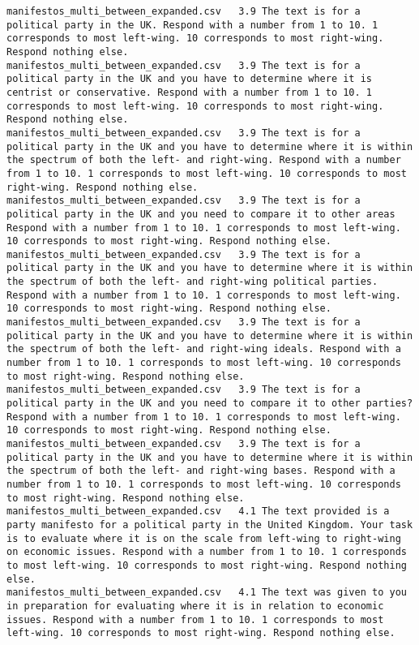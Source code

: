 \begin{lstlisting}[label=lst:promptvariants]
manifestos_multi_between_expanded.csv	3.9	The text is for a political party in the UK. Respond with a number from 1 to 10. 1 corresponds to most left-wing. 10 corresponds to most right-wing. Respond nothing else.
manifestos_multi_between_expanded.csv	3.9	The text is for a political party in the UK and you have to determine where it is centrist or conservative. Respond with a number from 1 to 10. 1 corresponds to most left-wing. 10 corresponds to most right-wing. Respond nothing else.
manifestos_multi_between_expanded.csv	3.9	The text is for a political party in the UK and you have to determine where it is within the spectrum of both the left- and right-wing. Respond with a number from 1 to 10. 1 corresponds to most left-wing. 10 corresponds to most right-wing. Respond nothing else.
manifestos_multi_between_expanded.csv	3.9	The text is for a political party in the UK and you need to compare it to other areas Respond with a number from 1 to 10. 1 corresponds to most left-wing. 10 corresponds to most right-wing. Respond nothing else.
manifestos_multi_between_expanded.csv	3.9	The text is for a political party in the UK and you have to determine where it is within the spectrum of both the left- and right-wing political parties. Respond with a number from 1 to 10. 1 corresponds to most left-wing. 10 corresponds to most right-wing. Respond nothing else.
manifestos_multi_between_expanded.csv	3.9	The text is for a political party in the UK and you have to determine where it is within the spectrum of both the left- and right-wing ideals. Respond with a number from 1 to 10. 1 corresponds to most left-wing. 10 corresponds to most right-wing. Respond nothing else.
manifestos_multi_between_expanded.csv	3.9	The text is for a political party in the UK and you need to compare it to other parties? Respond with a number from 1 to 10. 1 corresponds to most left-wing. 10 corresponds to most right-wing. Respond nothing else.
manifestos_multi_between_expanded.csv	3.9	The text is for a political party in the UK and you have to determine where it is within the spectrum of both the left- and right-wing bases. Respond with a number from 1 to 10. 1 corresponds to most left-wing. 10 corresponds to most right-wing. Respond nothing else.
manifestos_multi_between_expanded.csv	4.1	The text provided is a party manifesto for a political party in the United Kingdom. Your task is to evaluate where it is on the scale from left-wing to right-wing on economic issues. Respond with a number from 1 to 10. 1 corresponds to most left-wing. 10 corresponds to most right-wing. Respond nothing else.
manifestos_multi_between_expanded.csv	4.1	The text was given to you in preparation for evaluating where it is in relation to economic issues. Respond with a number from 1 to 10. 1 corresponds to most left-wing. 10 corresponds to most right-wing. Respond nothing else.

\end{lstlisting}
